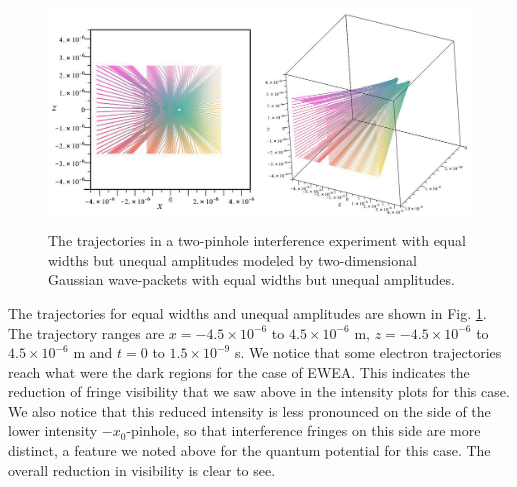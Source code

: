 \documentclass[12pt]{article}       %
\begin{document}
\begin{figure}[h]
\unitlength=1in
\hspace*{0.8in}\includegraphics[width=4.5in,height=2.36in]  {figure15.jpg}  
\caption{The trajectories in a two-pinhole interference experiment with  equal widths but unequal amplitudes modeled by two-dimensional Gaussian wave-packets with equal widths but unequal amplitudes.\label{TRAJEWUA}}
\end{figure}
The trajectories for equal widths and unequal amplitudes are shown in Fig.  \ref{TRAJEWUA}. The trajectory  ranges are $x=-4.5\times 10^{-6}$ to $4.5\times 10^{-6}$ m, $z=-4.5\times 10^{-6}$ to $4.5\times 10^{-6}$ m and $t=0$ to $1.5\times 10^{-9}$ s. We notice that some electron trajectories reach what were the dark regions for the case of EWEA. This indicates the reduction of fringe visibility that we saw above in the intensity plots for this case. We also notice that this reduced intensity  is less pronounced on the side of the  lower intensity $-x_0$-pinhole, so that interference fringes on this side are more distinct, a feature we noted above for the quantum potential for this case. The overall reduction in visibility is clear to see.
\end{document}
